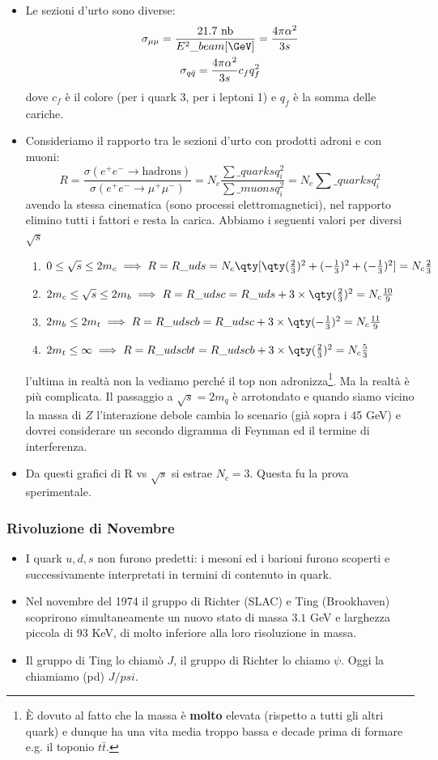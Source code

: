 \begin{itemize}
  \item Le sezioni d'urto sono diverse:
  \begin{gather*}
  \sigma_{\mu\mu}=\frac{21.7\text{ nb}}{E^2\_{beam}[\GeV]}=\frac{4\pi\alpha^2}{3s}\\
  \sigma_{q\bar q} =\frac{4\pi\alpha^2}{3s}c_fq_f^2
\end{gather*}
dove $c_f$ è il colore (per i quark 3, per i leptoni 1) e $q_f$ è la somma delle cariche.
\item Consideriamo il rapporto tra le sezioni d'urto con prodotti adroni e con muoni:
\begin{equation*}
R=\frac{\sigma(e^+e^-\to\text{hadrons})}{\sigma(e^+e^-\to\mu^+\mu^-)}=N_c\frac{\sum\_{quarks}q_i^2}{\sum\_{muons}q_i^2}=N_c\sum\_{quarks}q_i^2
\end{equation*}
avendo la stessa cinematica (sono processi elettromagnetici), nel rapporto elimino tutti i fattori e resta la carica. Abbiamo i seguenti valori per diversi $\sqrt s$ 
\begin{enumerate}
    \item $0\leq\sqrt s\leq 2m_c\implies R=R\_{uds}=N_c\qty[\qty(\frac23)^2+(-\frac13)^2+(-\frac13)^2]=N_c\frac23$
    \item $2m_c\leq\sqrt s\leq 2m_b\implies R=R\_{udsc}=R\_{uds}+3\times\qty(\frac23)^2=N_c\frac{10}9$ 
    \item $2m_b\leq2m_t\implies  R=R\_{udscb}=R\_{udsc}+3\times\qty(-\frac13)^2=N_c\frac{11}9$
    \item $2m_t\leq\infty\implies  R=R\_{udscbt}=R\_{udscb}+3\times\qty(\frac23)^2=N_c\frac53$
\end{enumerate}
l'ultima in realtà non la vediamo perché il top non adronizza\footnote{È dovuto al fatto che la massa è \textbf{molto} elevata (rispetto a tutti gli altri quark) e dunque ha una vita media troppo bassa e decade prima di formare e.g. il toponio $t\bar t$.}.
Ma la realtà è più complicata. Il passaggio a $\sqrt s=2m_q$ è arrotondato e quando siamo vicino la massa di $Z$ l'interazione debole cambia lo scenario (già sopra i 45 GeV) e dovrei considerare un secondo digramma di Feynman ed il termine di interferenza.
\item Da questi grafici di R vs $\sqrt s$ si estrae $N_c=3$. Questa fu la prova sperimentale. 
\end{itemize}
\subsubsection{Rivoluzione di Novembre}
\begin{itemize}
    \item I quark $u,d,s$ non furono predetti: i mesoni ed i barioni furono scoperti e successivamente interpretati in termini di contenuto in quark.
    \item Nel novembre del 1974 il gruppo di Richter (SLAC) e Ting (Brookhaven) scoprirono simultaneamente un nuovo stato di massa $3.1$ GeV e larghezza piccola di 93 KeV, di molto inferiore alla loro risoluzione in massa.
    \item Il gruppo di Ting lo chiamò $J$, il gruppo di Richter lo chiamo $\psi$. Oggi la chiamiamo (pd) $J/psi$.
\end{itemize}
